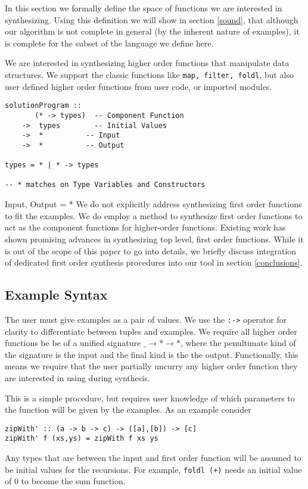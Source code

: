 In this section we formally define the space of functions we are interested in synthesizing. Using this definition we will show in section \ref{sound}, that although our algorithm is not complete in general (by the inherent nature of examples), it is complete for the subset of the language we define here.

We are interested in synthesizing higher order functions that manipulate data structures. We support the classic functions like \texttt{map, filter, foldl}, but also user defined higher order functions from user code, or imported modules. 

\begin{lstlisting}
solutionProgram ::
       (* -> types)  -- Component Function
    ->  types        -- Initial Values
    ->  *          -- Input
    ->  *          -- Output

types = * | * -> types

-- * matches on Type Variables and Constructors
\end{lstlisting}

Input, Output = *
We do not explicitly address synthesizing first order functions to fit the examples. We do employ a method to synthesize first order functions to act as the component functions for higher-order functions. Existing work has shown promising advances in synthesizing top level, first order functions\cite{potential, reviewers}. While it is out of the scope of this paper to go into details, we briefly discuss integration of dedicated first order synthesis procedures into our tool in section \ref{conclusions}.


\subsection{Example Syntax}
The user must give examples as a pair of values. We use the \texttt{:->} operator for clarity to differentiate between tuples and examples.
We require all higher order functions be be of a unified signature \texttt{$\_ \to * \to *$}, where the penultimate kind of the signature is the input and the final kind is the the output.  Functionally, this means we require that the user partially uncurry any higher order function they are interested in using during synthesis.

This is a simple procedure, but requires user knowledge of which parameters to the function will be given by the examples. 
As an example consider 

\begin{lstlisting}
zipWith' :: (a -> b -> c) -> ([a],[b]) -> [c]
zipWith' f (xs,ys) = zipWith f xs ys
\end{lstlisting}

Any types that are between the input and first order function will be assumed to be initial values for the recursions. For example, \texttt{foldl (+)} needs an initial value of 0 to become the sum function.

